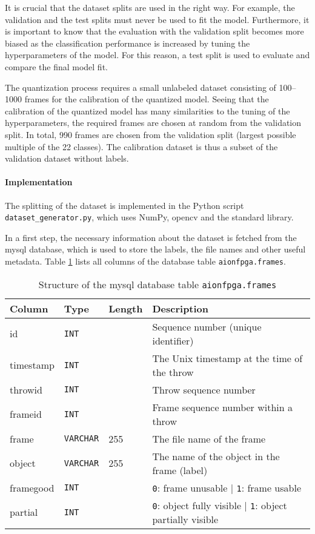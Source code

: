 It is crucial that the dataset splits are used in the right way.
For example, the validation and the test splits must never be used to fit the model.
Furthermore, it is important to know that the evaluation with the validation split becomes more biased as the classification performance is increased by tuning the hyperparameters of the model.
For this reason, a test split is used to evaluate and compare the final model fit.

The quantization process requires a small unlabeled dataset consisting of \numrange{100}{1000} frames for the calibration of the quantized model.
Seeing that the calibration of the quantized model has many similarities to the tuning of the hyperparameters, the required frames are chosen at random from the validation split.
In total, \num{990} frames are chosen from the validation split (largest possible multiple of the \num{22} classes).
The calibration dataset is thus a subset of the validation dataset without labels.

\paragraph{Implementation}
The splitting of the dataset is implemented in the Python script \texttt{dataset\_generator.py}, which uses NumPy, \acrshort{opencv} and the standard library.

In a first step, the necessary information about the dataset is fetched from the \acrshort{mysql} database, which is used to store the labels, the file names and other useful metadata.
Table \ref{tab:tab_frames_structure} lists all columns of the database table \texttt{aionfpga.frames}.

\begin{table}
  \caption{Structure of the \acrshort{mysql} database table \texttt{aionfpga.frames}}
  \label{tab:tab_frames_structure}
  \centering
  \begin{tabular}{llll}
    \toprule
    \textbf{Column} & \textbf{Type} & \textbf{Length} & \textbf{Description} \\
    \midrule
    id & \texttt{INT} &  & Sequence number (unique identifier) \\
    timestamp & \texttt{INT} &  & The Unix timestamp at the time of the throw \\
    throwid & \texttt{INT} &  & Throw sequence number \\
    frameid & \texttt{INT} &  & Frame sequence number within a throw \\
    frame & \texttt{VARCHAR} & 255 & The file name of the frame \\
    object & \texttt{VARCHAR} & 255 & The name of the object in the frame (label) \\
    framegood & \texttt{INT} &  & \texttt{0}: frame unusable | \texttt{1}: frame usable \\
    partial & \texttt{INT} &  & \texttt{0}: object fully visible | \texttt{1}: object partially visible \\
    \bottomrule
  \end{tabular}
\end{table}

